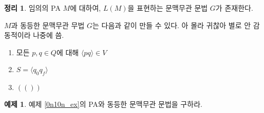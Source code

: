 \documentclass[b5paper]{book}
\theoremstyle{definition}
\newtheorem{thm}{정리}[chapter]
\newtheorem{ex}{예제}[chapter]
\newenvironment{pf*}{\pushQED{\qed}\pf}{\popQED\endpf}
\begin{document}
\begin{thm}
임의의 PA $M$에 대하여, $L(M)$을 표현하는 문맥무관 문법 $G$가 존재한다. 
\end{thm}
\begin{pf*}
$M$과 동등한 문맥무관 무법 $G$는 다음과 같이 만들 수 있다. 아 몰라 귀찮아 별로 
안 감동적이라 나중에 씀.
\begin{enumerate}
    \item 모든 $p, q \in Q$에 대해 $\langle pq \rangle \in V$
    \item $S = \langle q_0 q_f\rangle$
    \item $(())$
\end{enumerate}
\end{pf*}
\begin{ex}
    예제 \ref{0n10n_ex}의 PA와 동등한 문맥무관 문법을 구하라. 
\end{ex}
\end{document}
